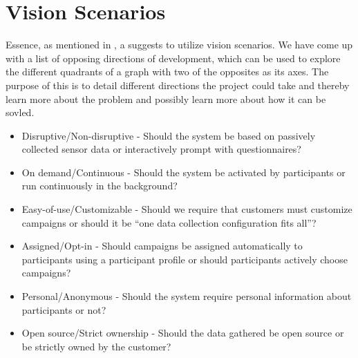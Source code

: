 \section{Vision Scenarios}
\label{sec:vision_scenarios}
Essence, as mentioned in , a suggests to utilize vision scenarios. We have come up with a list of opposing directions of development, which can be used to explore the different quadrants of a graph with two of the opposites as its axes. The purpose of this is to detail different directions the project could take and thereby learn more about the problem and possibly learn more about how it can be sovled. 


\begin{itemize}
	\setlength\itemsep{-0.2em}
    \item Disruptive/Non-disruptive - Should the system be based on passively collected sensor data or interactively prompt with questionnaires? %
    \item On demand/Continuous - Should the system be activated by participants or run continuously in the background? %
    \item Easy-of-use/Customizable - Should we require that customers must customize campaigns or should it be ``one data collection configuration fits all''? %
    \item Assigned/Opt-in - Should campaigns be assigned automatically to participants using a participant profile or should participants actively choose campaigns? %
    \item Personal/Anonymous - Should the system require personal information about participants or not? %
    \item Open source/Strict ownership - Should the data gathered be open source or be strictly owned by the customer?
\end{itemize}

